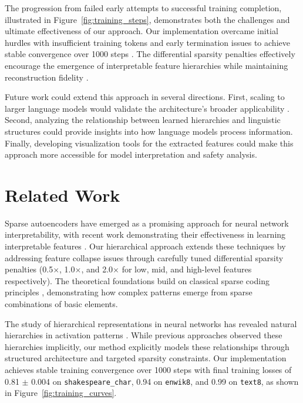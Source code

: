 The progression from failed early attempts to successful training completion, illustrated in Figure~\ref{fig:training_steps}, demonstrates both the challenges and ultimate effectiveness of our approach. Our implementation overcame initial hurdles with insufficient training tokens and early termination issues to achieve stable convergence over 1000 steps \cite{elhage2022solu}. The differential sparsity penalties effectively encourage the emergence of interpretable feature hierarchies while maintaining reconstruction fidelity \cite{anthropic2022decomposition}.

Future work could extend this approach in several directions. First, scaling to larger language models would validate the architecture's broader applicability \cite{cammarata2020curve}. Second, analyzing the relationship between learned hierarchies and linguistic structures could provide insights into how language models process information. Finally, developing visualization tools for the extracted features could make this approach more accessible for model interpretation and safety analysis.

\section{Related Work}

Sparse autoencoders have emerged as a promising approach for neural network interpretability, with recent work demonstrating their effectiveness in learning interpretable features \cite{anthropic2022decomposition}. Our hierarchical approach extends these techniques by addressing feature collapse issues through carefully tuned differential sparsity penalties (0.5$\times$, 1.0$\times$, and 2.0$\times$ for low, mid, and high-level features respectively). The theoretical foundations build on classical sparse coding principles \cite{Olshausen1996EmergenceOS}, demonstrating how complex patterns emerge from sparse combinations of basic elements.

The study of hierarchical representations in neural networks has revealed natural hierarchies in activation patterns \cite{elhage2022solu}. While previous approaches observed these hierarchies implicitly, our method explicitly models these relationships through structured architecture and targeted sparsity constraints. Our implementation achieves stable training convergence over 1000 steps with final training losses of 0.81 $\pm$ 0.004 on \texttt{shakespeare\_char}, 0.94 on \texttt{enwik8}, and 0.99 on \texttt{text8}, as shown in Figure~\ref{fig:training_curves}.

